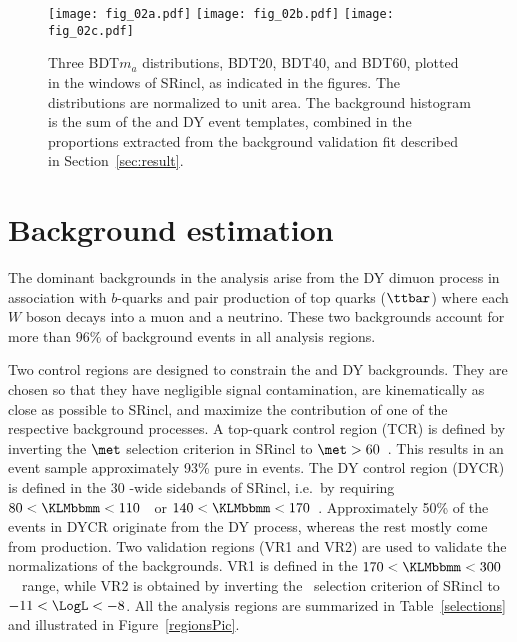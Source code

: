 \documentclass[cernpreprint, backref=false, texlive=2020, UKenglish, dvipsnames, block=none, texmf]{atlasdoc}
\begin{document}
\begin{figure}
\centering
\texttt{[image: fig\_02a.pdf]}
\texttt{[image: fig\_02b.pdf]}
\texttt{[image: fig\_02c.pdf]}
\caption{Three BDT$m_a$ distributions, BDT20, BDT40, and BDT60, plotted in the \Mmm windows of SRincl, as indicated in the figures. The distributions are normalized to unit area. The background histogram is the sum of the \ttbar and DY event templates, combined in the proportions extracted from the background validation fit described in Section~\ref{sec:result}.}
\label{BDToutputs}
\end{figure}
 
 
 
 
 
 
 
 
 
 
 
 
 
\section{Background estimation}
\label{sec:backgrounds}
The dominant backgrounds in the analysis arise from the DY dimuon process in association with $b$-quarks and  pair production of top quarks ($\ttbar$) where each $W$ boson decays into a muon and a neutrino. These two backgrounds account for more than $96\%$ of background events in all analysis regions.
 
Two control regions are designed to constrain the  \ttbar and DY backgrounds. They are chosen so that they have negligible signal contamination, are kinematically as close as possible to SRincl, and maximize the contribution of one of the respective background processes.
A top-quark control region (TCR) is defined by inverting the $\met$ selection criterion in SRincl to $\met>60$~\GeV. This results in an event sample approximately 93\% pure in \ttbar events. The DY control region (DYCR) is defined in the 30 \GeV-wide \KLMbbmm sidebands of SRincl, i.e.\ by requiring $80 <\KLMbbmm<110$~\GeV\ or $140 <\KLMbbmm<170$~\GeV. Approximately 50\% of the events in DYCR originate from the DY process, whereas the rest mostly come from \ttbar production.
Two validation regions (VR1 and VR2) are used to validate the normalizations of the backgrounds. VR1 is defined in the $170 <\KLMbbmm<300$~\GeV\ range, while VR2 is obtained by inverting the \LogL\ selection criterion of SRincl to $-11< \LogL <-8$. All the analysis regions are summarized in Table~\ref{selections} and illustrated in Figure~\ref{regionsPic}.
 
\end{document}
